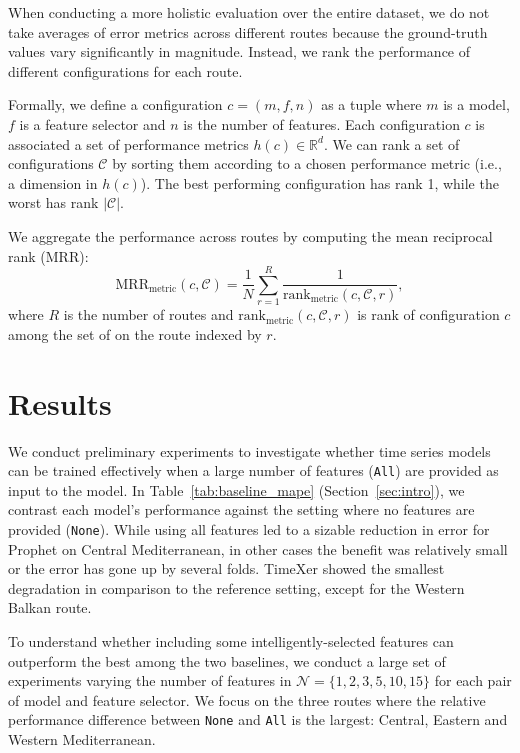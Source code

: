 \documentclass[conference]{IEEEtran}
\begin{document}
When conducting a more holistic evaluation over the entire dataset, we do not take averages of error metrics across different routes because the ground-truth values vary significantly in magnitude. Instead, we rank the performance of different configurations for each route.

Formally, we define a configuration $c = (m, f, n)$ as a tuple where $m$ is a model, $f$ is a feature selector and $n$ is the number of features. Each configuration $c$ is associated a set of performance metrics $h(c) \in \mathbb{R}^d$. We can rank a set of configurations $\mathcal{C}$ by sorting them according to a chosen performance metric (i.e., a dimension in $h(c)$). The best performing configuration has rank 1, while the worst has rank $|\mathcal{C}|$.

We aggregate the performance across routes by computing the mean reciprocal rank (MRR):
\begin{equation}\label{eq:mrr}
    \mathrm{MRR}_\mathrm{metric}(c,\mathcal{C}) = \frac{1}{N}\sum_{r=1}^{R} \frac{1}{\mathrm{rank}_\mathrm{metric}(c,\mathcal{C},r)},
\end{equation}
where $R$ is the number of routes and $\mathrm{rank}_\mathrm{metric}(c,\mathcal{C},r)$ is rank of configuration $c$ among the set of  on the route indexed by $r$.

\section{Results}

We conduct preliminary experiments to investigate whether time series models can be trained effectively when a large number of features (\texttt{All}) are provided as input to the model. In Table~\ref{tab:baseline_mape} (Section~\ref{sec:intro}), we contrast each model's performance against the setting where no features are provided (\texttt{None}). While using all features led to a sizable reduction in error for Prophet on Central Mediterranean, in other cases the benefit was relatively small or the error has gone up by several folds. TimeXer showed the smallest degradation in comparison to the reference setting, except for the Western Balkan route.

To understand whether including some intelligently-selected features can outperform the best among the two baselines, we conduct a large set of experiments varying the number of features in  $\mathcal{N} = \{1,2,3,5,10,15\}$ for each pair of model and feature selector. We focus on the three routes where the relative performance difference between \texttt{None} and \texttt{All} is the largest: Central, Eastern and Western Mediterranean.
\end{document}
